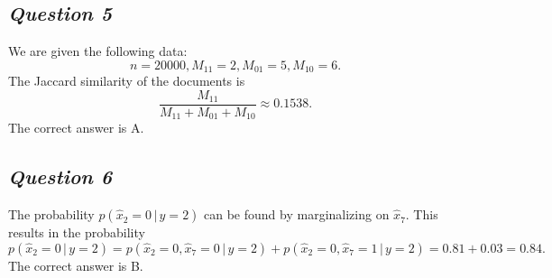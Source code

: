 \documentclass[twoside,11pt]{article}
\makeatletter
\let\@oldsubsection\subsection
\renewcommand\subsection[1]{\@oldsubsection*{\textit{#1}}}
\makeatother
\begin{document}
\subsection{Question 5}

We are given the following data:
\[
	n = 20000, M_{11} = 2, M_{01} = 5, M_{10} = 6.
\]
The Jaccard similarity of the documents is
\[
	\frac{M_{11}}{M_{11} + M_{01} + M_{10}} \approx 0.1538.
\]
The correct answer is A.

\subsection{Question 6}

The probability \(p(\hat{x}_2 = 0 \, | \, y = 2)\) can be found by marginalizing on \(\hat{x}_7\). This results in the probability
\[
	p(\hat{x}_2 = 0 \, | \, y = 2) = p(\hat{x}_2 = 0, \hat{x}_7 = 0 \, | \, y = 2)
	+ p(\hat{x}_2 = 0, \hat{x}_7 = 1 \, | \, y = 2) = 0.81 + 0.03 = 0.84.
\]
The correct answer is B.
\end{document}
